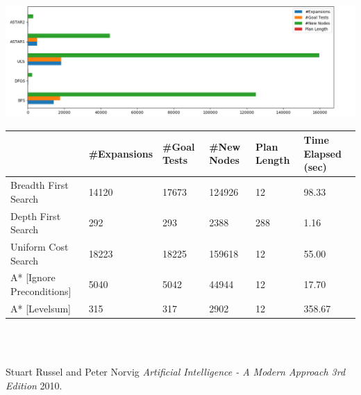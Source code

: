 \documentclass{article}
\begin{document}
\begin{center}
  \includegraphics[width=\textwidth]{problem3.jpg}

  \begin{tabular}{ | l | l | l | l | l | l | }
    \hline
                                & #Expansions & #Goal Tests & #New Nodes  & Plan Length & Time Elapsed (sec) \\ \hline \hline
    Breadth First Search        & 14120       & 17673       & 124926      & 12    & 98.33   \\ \hline
    Depth First Search          & 292         & 293         & 2388        & 288   & 1.16    \\ \hline
    Uniform Cost Search         & 18223       & 18225       & 159618      & 12    & 55.00   \\ \hline
    A* [Ignore Preconditions]   & 5040        & 5042        & 44944       & 12    & 17.70   \\ \hline
    A* [Levelsum]               & 315         & 317         & 2902        & 12    & 358.67  \\ \hline
  \end{tabular}
\end{center} \\ \\

\begin{thebibliography}{1}
 Stuart Russel and Peter Norvig {\em Artificial Intelligence - A Modern
Approach 3rd Edition} 2010.
\end{thebibliography}
\end{document}
